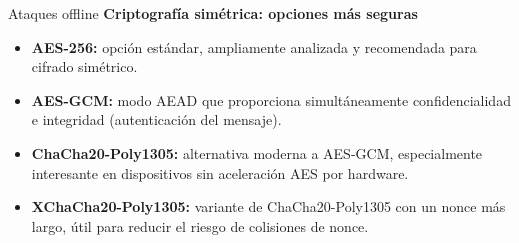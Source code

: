 \documentclass[aspectratio=169,11pt]{beamer}
\newcommand{\lead}[1]{{\bfseries #1}\par\medskip}
\begin{document}
\begin{frame}{Ataques offline}
\small
\lead{Criptografía simétrica: opciones más seguras}
\begin{itemize}
    \item \textbf{AES-256:} opción estándar, ampliamente analizada y recomendada para cifrado simétrico.
    
    \item \textbf{AES-GCM:} modo AEAD que proporciona simultáneamente confidencialidad e integridad (autenticación del mensaje).
    
    \item \textbf{ChaCha20-Poly1305:} alternativa moderna a AES-GCM, especialmente interesante en dispositivos sin aceleración AES por hardware.
    
    \item \textbf{XChaCha20-Poly1305:} variante de ChaCha20-Poly1305 con un nonce más largo, útil para reducir el riesgo de colisiones de nonce.
\end{itemize}
\end{frame}
\end{document}
